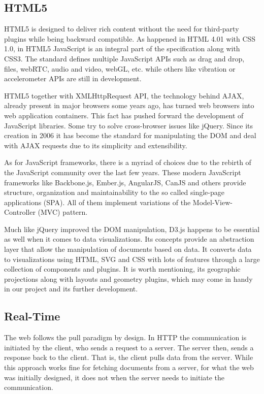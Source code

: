 \subsection{HTML5}

HTML5 is designed to deliver rich content without the need for third-party plugins while being backward compatible. As happened in HTML 4.01 with CSS 1.0, in HTML5 JavaScript is an integral part of the specification along with CSS3. The standard defines multiple JavaScript APIs such as drag and drop, files, webRTC, audio and video, webGL, etc. while others like vibration or accelerometer APIs are still in development.

HTML5 together with XMLHttpRequest API, the technology behind AJAX, already present in major browsers some years ago, has turned web browsers into web application containers. This fact has pushed forward the development of JavaScript libraries. Some try to solve cross-browser issues like jQuery. Since its creation in 2006 it has become the standard for manipulating the DOM and deal with AJAX requests due to its simplicity and extensibility.

As for JavaScript frameworks, there is a myriad of choices due to the rebirth of the JavaScript community over the last few years. These modern JavaScript frameworks like Backbone.js, Ember.js, AngularJS, CanJS and others provide structure, organization and maintainability to the so called single-page applications (SPA). All of them implement variations of the Model-View-Controller (MVC) pattern.

Much like jQuery improved the DOM manipulation, D3.js happens to be essential as well when it comes to data visualizations. Its concepts provide an abstraction layer that allow the manipulation of documents based on data. It converts data to visualizations using HTML, SVG and CSS with lots of features through a large collection of components and plugins. It is worth mentioning, its geographic projections along with layouts and geometry plugins, which may come in handy in our project and its further development.

\subsection{Real-Time} \label{web_real_time}

The web follows the pull paradigm by design. In HTTP the communication is initiated by the client, who sends a request to a server. The server then, sends a response back to the client. That is, the client pulls data from the server. While this approach works fine for fetching documents from a server, for what the web was initially designed, it does not when the server needs to initiate the communication.

